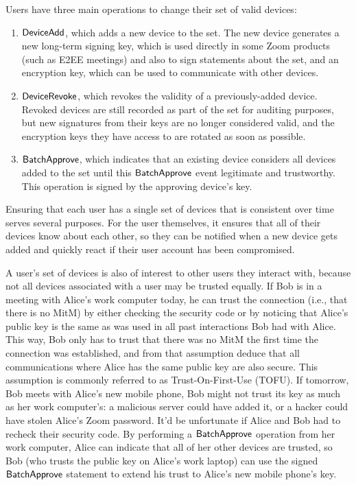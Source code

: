Users have three main operations to change their set of valid devices:
\begin{enumerate}
\item $\mathsf{DeviceAdd}{}$, which adds a new device to the set. The new device generates a new long-term
    signing key, which is used directly in some Zoom products (such as E2EE meetings) and also to
    sign statements about the set, and an encryption key, which can be used to communicate with
    other devices.
\item $\mathsf{DeviceRevoke}{}$, which revokes the validity of a previously-added device. Revoked devices
    are still recorded as part of the set for auditing purposes, but new signatures from their keys
    are no longer considered valid, and the encryption keys they have access to are rotated as soon
    as possible.
\item $\mathsf{BatchApprove}{}$, which indicates that an existing device considers all devices added to the
    set until this $\mathsf{BatchApprove}{}$ event legitimate and trustworthy. This operation is signed by
    the approving device's key.
\end{enumerate}

Ensuring that each user has a single set of devices that is consistent over time serves several
purposes. For the user themselves, it ensures that all of their devices know about each other, so
they can be notified when a new device gets added and quickly react if their user account has been
compromised.

A user's set of devices is also of interest to other users they interact with, because not all
devices associated with a user may be trusted equally. If Bob is in a meeting with Alice's work
computer today, he can trust the connection (i.e., that there is no MitM) by either checking the
security code or by noticing that Alice's public key is the same as was used in all past
interactions Bob had with Alice. This way, Bob only has to trust that there was no MitM the first
time the connection was established, and from that assumption deduce that all communications where
Alice has the same public key are also secure. This assumption is commonly referred to as
Trust-On-First-Use (TOFU). If tomorrow, Bob meets with Alice's new mobile phone, Bob might not trust
its key as much as her work computer's: a malicious server could have added it, or a hacker could
have stolen Alice's Zoom password. It'd be unfortunate if Alice and Bob had to recheck their
security code. By performing a $\mathsf{BatchApprove}{}$ operation from her work computer, Alice can
indicate that all of her other devices are trusted, so Bob (who trusts the public key on Alice's
work laptop) can use the signed $\mathsf{BatchApprove}{}$ statement to extend his trust to Alice's new
mobile phone's key.

